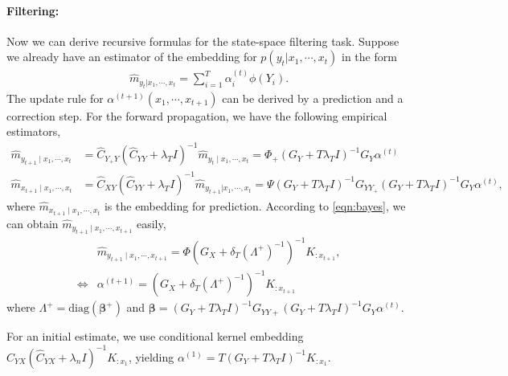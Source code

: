 \documentclass[a4paper]{article}
\newcommand{\up}{\mathrm}
\newcommand{\bs}{\boldsymbol}
\begin{document}
\paragraph{Filtering:}
Now we can derive recursive formulas for the state-space filtering task. Suppose we already have an estimator of the embedding for $p(y_t|x_1,\cdots,x_t)$ in the form
\begin{align}
\hat{m}_{y_t|x_1,\cdots,x_t} = \sum_{i=1}^T \alpha_i^{(t)} \phi(Y_i).
\end{align}
The update rule for $\alpha^{(t+1)}(x_1,\cdots,x_{t+1})$ can be derived by a prediction and a correction step. For the forward propagation, we have the following empirical estimators,
\begin{align}
\hat{m}_{y_{t+1}\mid x_1,\cdots,x_t} &= \hat{C}_{Y_{+}Y}(\hat{C}_{YY}+\lambda_T I)^{-1}\hat{m}_{y_t\mid x_1,\cdots,x_t} = \Phi_{+}(G_Y + T\lambda_T I)^{-1}G_Y \alpha^{(t)}\\
\hat{m}_{x_{t+1}\mid x_1,\cdots,x_t} &= \hat{C}_{XY}(\hat{C}_{YY} + \lambda_{T}I)^{-1}\hat{m}_{y_{t+1}|x_1,\cdots,x_t} = \Psi(G_{Y} + T\lambda_T I)^{-1} G_{YY_+}(G_Y + T\lambda_T I)^{-1}G_{Y} \alpha^{(t)},
\end{align}
where $\hat{m}_{x_{t+1}\mid x_1,\cdots,x_t}$ is the embedding for prediction. According to \eqref{eqn:bayes}, we can obtain $\hat{m}_{y_{t+1}\mid x_1,\cdots,x_{t+1}}$ easily,
\begin{align}
&\hat{m}_{y_{t+1}\mid x_1,\cdots,x_{t+1}} = \Phi(G_X + \delta_T (\Lambda^+)^{-1})^{-1} K_{:x_{t+1}},\\
\Leftrightarrow& \alpha^{(t+1)} = (G_X + \delta_T (\Lambda^+)^{-1})^{-1} K_{:x_{t+1}}
\end{align}
where $\Lambda^+ = \up{diag}(\bs{\beta}^+)$ and $\bs{\beta} = (G_Y + T\lambda_T I)^{-1}G_{YY+}(G_Y + T\lambda_T I)^{-1}G_Y \alpha^{(t)}$.

For an initial estimate, we use conditional kernel embedding $\widehat{C}_{YX}(\widehat{C}_{YX} + \lambda_n I)^{-1} K_{:x_1}$, yielding $\alpha^{(1)} = T(G_Y + T\lambda_T I)^{-1}K_{:x_1}$.
\end{document}
